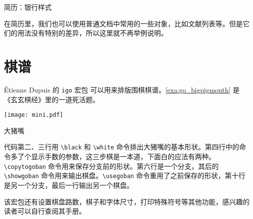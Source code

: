 \begin{example}[htbp]
\begin{Demo}
\centering
{}
\end{Demo}
\caption{简历：银行样式}
\label{exa:cv_banking}
\end{example}

在简历里，我们也可以使用普通文档中常用的一些对象，比如文献列表等。但是它们的用法没有特别的差异，所以这里就不再举例说明。

\section{棋谱}

Étienne Dupuis \indexDupuis 的 \texttt{igo} 宏包 \citep{Dupuis_igo} 可以用来排版围棋棋谱。\autoref{exa:go_bigpigmouth} 是《玄玄棋经》里的一道死活题。

\begin{example}[htbp]
\begin{FBTDemo}[numbers=left]{
\centering
\texttt{[image: mini.pdf]}
}
\usepackage{igo}
\showgoban
\quad
{}
\showgoban
\end{FBTDemo}
\caption{大猪嘴}
\label{exa:go_bigpigmouth}
\end{example}

代码第二、三行用 \verb|\black| 和 \verb|\white| 命令排出大猪嘴的基本形状。第四行中的命令多了个显示手数的参数，这三步棋是一本道，下面白的应法有两种。\verb|\copytogoban| 命令用来保存分支前的形状。第六行是一个分支，其后的 \verb|\showgoban| 命令用来输出棋盘。\verb|\usegoban| 命令重用了之前保存的形状，第十行是另一个分支，最后一行输出另一个棋盘。

该宏包还有设置棋盘路数，棋子和字体尺寸，打印特殊符号等其他功能，感兴趣的读者可以自行查阅其手册。




